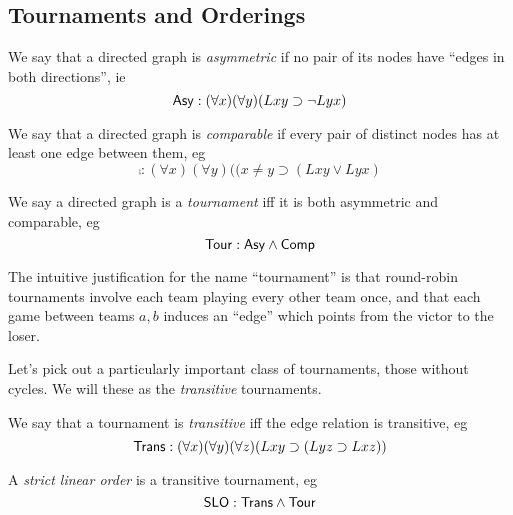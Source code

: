 \subsection*{Tournaments and Orderings}


\begin{definition}
We say that a directed graph is \emph{asymmetric} if no pair of its nodes have ``edges in both directions'', ie
\[
  \mbox{$\mathsf{Asy}$}: (\forall x)(\forall y)(Lxy\supset \neg Lyx)  
\]
\end{definition}

\begin{definition}
We say that a directed graph is \emph{comparable} if every pair of distinct nodes has at least one edge between them, eg
\[
    \comp: (\forall x)(\forall y)((x\neq y\supset (Lxy\vee Lyx)
\]
\end{definition}

\begin{definition}
We say a directed graph is a \emph{tournament} iff it is both asymmetric and comparable, eg
\[
    \mbox{$\mathsf{Tour}$}: \mbox{$\mathsf{Asy}$} \land \mbox{$\mathsf{Comp}$}
\]
\end{definition}
The intuitive justification for the name ``tournament'' is that round-robin tournaments involve each team playing every other team once, and that each game between teams $a, b$ induces an ``edge'' which points from the victor to the loser. 

Let's pick out a particularly important class of tournaments, those without cycles. We will these as the \emph{transitive} tournaments. 

\begin{definition}
We say that a tournament is \emph{transitive} iff the edge relation is transitive, eg
\[
    \mbox{$\mathsf{Trans}$}: (\forall x)(\forall y)(\forall z)(Lxy\supset(Lyz\supset Lxz))
\]
\end{definition}

\begin{definition}
A \emph{strict linear order} is a transitive tournament, eg
\[
    \mbox{$\mathsf{SLO}$}: \mbox{$\mathsf{Trans}$} \land \mbox{$\mathsf{Tour}$}
\]
\end{definition}